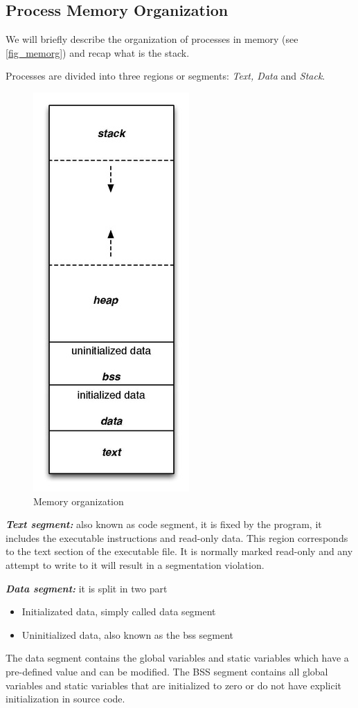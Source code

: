 \documentclass[10pt,twocolumn]{article}
\begin{document}
\subsection{Process Memory Organization} 
We will briefly describe the
organization of processes in memory (see \autoref{fig_memorg}) and recap what is the stack. 

Processes are divided into three regions or segments: \textit{Text, Data} and
\textit{Stack}.

\begin{figure}[h]
  \centering
  \includegraphics[scale=.85]{./graphics/memory_organization.jpg}
  \caption{Memory organization}
  \label{fig_memorg}
\end{figure}

\textbf{\textit{Text segment:}} also known as code segment, it is fixed by the program, it
includes the executable instructions and read-only data. This region
corresponds to the text section of the executable file. It is normally
marked read-only and any attempt to write to it will result in a segmentation
violation.

\textbf{\textit{Data segment:}} it is split in two part
\begin{itemize}
\item Initializated data, simply called data segment
\item Uninitialized data, also known as the bss segment
\end{itemize}
    The data segment contains the global variables and static variables
which have a pre-defined value and can be modified. The BSS segment contains
all global variables and static variables that are initialized to zero or do
not have explicit initialization in source code.
\end{document}
